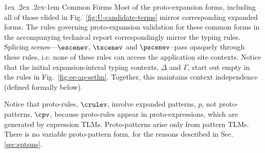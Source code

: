 \documentclass[acmsmall]{acmart}
\makeatletter
\renewcommand{\paragraph}{%
  \@startsection{paragraph}{4}%
  {\z@}{1ex \@plus .2ex \@minus .2ex}{-1em}%
  {\normalfont\normalsize\bfseries}%
}
\makeatother
\begin{document}
\paragraph{Common Forms} Most of the proto-expansion forms, including all of those elided in Fig.~\ref{fig:U-candidate-terms} mirror corresponding expanded forms. The rules governing proto-expansion validation for these common forms  in the accompanying technical report correspondingly mirror the typing rules. Splicing scenes---$\escenev$, $\tscenev$ and $\pscenev$--pass opaquely through these rules, i.e. none of these rules can access the application site contexts. Notice that the initial expansion-interal typing contexts, $\Delta$ and $\Gamma$, start out empty in the rules in Fig.~\ref{fig:ee-ap-setlm}. Together, this maintains context independence (defined formally below).

Notice that proto-rules, $\crulev$, involve expanded patterns, $p$, not proto-patterns, $\cpv$, because proto-rules appear in proto-expressions, which are generated by expression TLMs. Proto-patterns arise only from pattern TLMs. There is no variable proto-pattern form, for the reasons described in Sec. \ref{sec:sptsms}.
\end{document}

